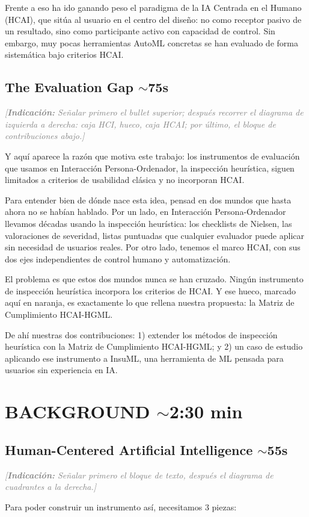 \documentclass[11pt,a4paper]{article}
\newcommand{\indicacion}[1]{%
    \par\medskip
    \noindent\textcolor{gray}{\textit{[\textbf{Indicaci\'on:} #1]}}
    \par\medskip
}
\begin{document}
Frente a eso ha ido ganando peso el paradigma de la IA Centrada en el Humano (HCAI), que sitúa al usuario en el centro del diseño: no como receptor pasivo de un resultado, sino como participante activo con capacidad de control. Sin embargo, muy pocas herramientas AutoML concretas se han evaluado de forma sistemática bajo criterios HCAI.

\subsection{The Evaluation Gap \hfill \normalfont\small $\sim$75s}
\indicacion{Señalar primero el bullet superior; después recorrer el diagrama de izquierda a derecha: caja HCI, hueco, caja HCAI; por último, el bloque de contribuciones abajo.}
Y aquí aparece la razón que motiva este trabajo: los instrumentos de evaluación que usamos en Interacción Persona-Ordenador, la inspección heurística, siguen limitados a criterios de usabilidad clásica y no incorporan HCAI.

Para entender bien de dónde nace esta idea, pensad en dos mundos que hasta ahora no se habían hablado. Por un lado, en Interacción Persona-Ordenador llevamos décadas usando la inspección heurística: los checklists de Nielsen, las valoraciones de severidad, listas puntuadas que cualquier evaluador puede aplicar sin necesidad de usuarios reales. Por otro lado, tenemos el marco HCAI, con sus dos ejes independientes de control humano y automatización.

El problema es que estos dos mundos nunca se han cruzado. Ningún instrumento de inspección heurística incorpora los criterios de HCAI. Y ese hueco, marcado aquí en naranja, es exactamente lo que rellena nuestra propuesta: la Matriz de Cumplimiento HCAI-HGML.

De ahí nuestras dos contribuciones: 1) extender los métodos de inspección heurística con la Matriz de Cumplimiento HCAI-HGML; y 2) un caso de estudio aplicando ese instrumento a InsuML, una herramienta de ML pensada para usuarios sin experiencia en IA.

\section{BACKGROUND \hfill \normalfont\small $\sim$2:30 min}

\subsection{Human-Centered Artificial Intelligence \hfill \normalfont\small $\sim$55s}
\indicacion{Señalar primero el bloque de texto, después el diagrama de cuadrantes a la derecha.}
Para poder construir un instrumento así, necesitamos 3 piezas:
\end{document}
